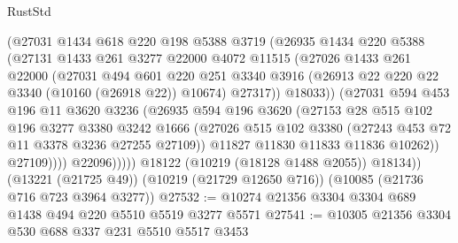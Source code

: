 \begin{lexlean}{RustStd}
\begin{coremodule}
                      (@27031
                        @1434
                        @618
                        @220
                        @198
                        @5388
                        @3719
                        (@26935
                          @1434
                          @220
                          @5388
                          (@27131
                            @1433
                            @261
                            @3277
                            @22000
                            @4072
                            @11515
                            (@27026
                              @1433
                              @261
                              @22000
                              (@27031
                                @494
                                @601
                                @220
                                @251
                                @3340
                                @3916
                                (@26913 @22 @220 @22 @3340 (@10160 (@26918 @22)) @10674)
                                @27317))
                            @18033))
                        (@27031
                          @594
                          @453
                          @196
                          @11
                          @3620
                          @3236
                          (@26935
                            @594
                            @196
                            @3620
                            (@27153
                              @28
                              @515
                              @102
                              @196
                              @3277
                              @3380
                              @3242
                              @1666
                              (@27026
                                @515
                                @102
                                @3380
                                (@27243 @453 @72 @11 @3378 @3236 @27255 @27109))
                              @11827
                              @11830
                              @11833
                              @11836
                              @10262))
                          @27109))))
                  @22096)))))
        @18122
        (@10219 (@18128 @1488 @2055))
        @18134))
    (@13221 (@21725 @49))
    (@10219 (@21729 @12650 @716))
    (@10085 (@21736 @716 @723 @3964 @3277))
@27532 := @10274 @21356 @3304 @3304 @689 @1438 @494 @220 @5510 @5519 @3277 @5571
@27541 := @10305 @21356 @3304 @530 @688 @337 @231 @5510 @5517 @3453

\end{coremodule}
\end{lexlean}

